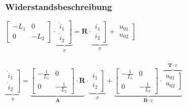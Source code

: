 \documentclass[a4paper,twocolumn,10pt]{article}
\begin{document}
\subsubsection*{Widerstandsbeschreibung}
$\begin{bmatrix}-L_1 & 0 \\ 0 & -L_2\end{bmatrix}\cdot \underbrace{\left.\begin{matrix}\dot i_1 \\ \dot i_2\end{matrix}\right]}_{\underline{\dot x}}=\textbf{R}\cdot \underbrace{\left.\begin{matrix}i_1 \\ i_2\end{matrix}\right]}_{\underline{x}}+\left.\begin{matrix}u_{01} \\ u_{02}\end{matrix}\right]$\\\\
$\underbrace{\left.\begin{matrix}\dot i_1 \\ \dot i_2\end{matrix}\right]}_{\underline{\dot x}}=\underbrace{\begin{bmatrix}-\frac{1}{L_1} & 0 \\ 0 & -\frac{1}{L_2}\end{bmatrix}\cdot\textbf{R}}_{\textbf{A}}\cdot \underbrace{\left.\begin{matrix}i_1 \\ i_2\end{matrix}\right]}_{\underline{x}}+\underbrace{\begin{bmatrix}-\frac{1}{L_1} & 0 \\ 0 & -\frac{1}{L_2}\end{bmatrix}\cdot\overbrace{\left.\begin{matrix}u_{01} \\ u_{02}\end{matrix}\right]}^{\textbf{T}\cdot \underline{v}}}_{\textbf{B}\cdot \underline{v}}$
\end{document}

